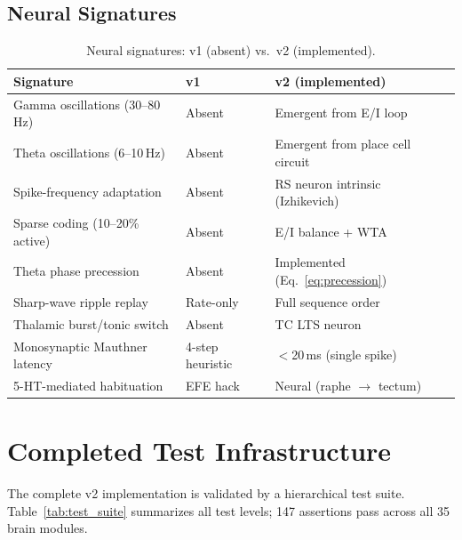 \documentclass[11pt,a4paper]{article}
\begin{document}
\subsection{Neural Signatures}

\begin{table}[H]
\centering
\caption{Neural signatures: v1 (absent) vs.\ v2 (implemented).}
\label{tab:neural_sigs}
\begin{tabular}{lll}
\toprule
Signature & v1 & v2 (implemented) \\
\midrule
Gamma oscillations (30--80\,Hz) & Absent & Emergent from E/I loop \\
Theta oscillations (6--10\,Hz) & Absent & Emergent from place cell circuit \\
Spike-frequency adaptation & Absent & RS neuron intrinsic (Izhikevich) \\
Sparse coding (10--20\% active) & Absent & E/I balance + WTA \\
Theta phase precession & Absent & Implemented (Eq.~\ref{eq:precession}) \\
Sharp-wave ripple replay & Rate-only & Full sequence order \\
Thalamic burst/tonic switch & Absent & TC LTS neuron \\
Monosynaptic Mauthner latency & 4-step heuristic & $<$20\,ms (single spike) \\
5-HT-mediated habituation & EFE hack & Neural (raphe $\to$ tectum) \\
\bottomrule
\end{tabular}
\end{table}

\section{Completed Test Infrastructure}\label{sec:tests}

The complete v2 implementation is validated by a hierarchical test suite.
Table~\ref{tab:test_suite} summarizes all test levels; 147 assertions
pass across all 35 brain modules.
\end{document}
